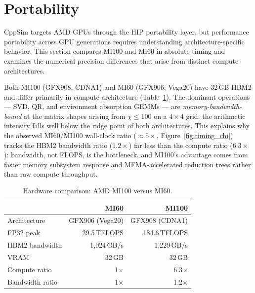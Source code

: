 \documentclass[11pt]{article}
\begin{document}
\clearpage
\section{Portability}
\label{sec:portability}

CppSim targets AMD GPUs through the HIP portability layer, but performance
portability across GPU generations requires understanding architecture-specific
behavior.
This section compares MI100 and MI60 in absolute timing and examines the
numerical precision differences that arise from distinct compute architectures.

Both MI100 (GFX908, CDNA1) and MI60 (GFX906, Vega20) have 32\,GB HBM2 and
differ primarily in compute architecture (Table~\ref{tab:hardware}).
The dominant operations --- SVD, QR, and environment absorption GEMMs --- are
\emph{memory-bandwidth-bound} at the matrix shapes arising from $\chi \leq 100$
on a $4\times4$ grid: the arithmetic intensity falls well below the ridge point
of both architectures.
This explains why the observed MI60/MI100 wall-clock ratio ($\approx5\times$,
Figure~\ref{fig:timing_chi}) tracks the HBM2 bandwidth ratio ($1.2\times$)
far less than the compute ratio ($6.3\times$): bandwidth, not FLOPS, is the
bottleneck, and MI100's advantage comes from faster memory subsystem response
and MFMA-accelerated reduction trees rather than raw compute throughput.

\begin{table}[ht]
\centering
\caption{Hardware comparison: AMD MI100 versus MI60.}
\label{tab:hardware}
\small
\begin{tabular}{lrr}
\toprule
& MI60 & MI100 \\
\midrule
Architecture     & GFX906 (Vega20)  & GFX908 (CDNA1) \\
FP32 peak        & 29.5\,TFLOPS     & 184.6\,TFLOPS \\
HBM2 bandwidth   & 1{,}024\,GB/s    & 1{,}229\,GB/s \\
VRAM             & 32\,GB           & 32\,GB \\
Compute ratio    & 1$\times$        & 6.3$\times$ \\
Bandwidth ratio  & 1$\times$        & 1.2$\times$ \\
\bottomrule
\end{tabular}
\end{table}
\end{document}
